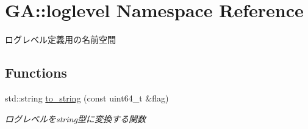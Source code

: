 \hypertarget{namespace_g_a_1_1loglevel}{}\section{GA\+::loglevel Namespace Reference}
\label{namespace_g_a_1_1loglevel}


ログレベル定義用の名前空間  


\subsection*{Functions}
\begin{DoxyCompactItemize}
\item 
std\+::string \mbox{\hyperlink{namespace_g_a_1_1loglevel_a9319a21550f7dfdd3229358e00009ce4}{to\+\_\+string}} (const uint64\+\_\+t \&flag)
\begin{DoxyCompactList}\small\item\em ログレベルをstring型に変換する関数 \end{DoxyCompactList}\end{DoxyCompactItemize}
